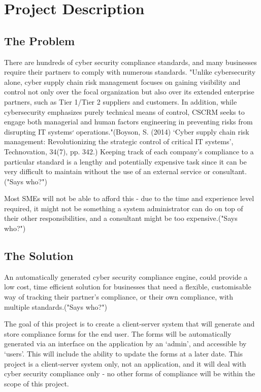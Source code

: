 \chapter{Project Description} \label{Chapter:one}
    \section{The Problem}
        There are hundreds of cyber security compliance standards, and many businesses require their partners to comply with numerous standards. "Unlike cybersecurity alone, cyber supply chain risk management focuses on gaining visibility and control not only over the focal organization but also over its extended enterprise partners, such as Tier 1/Tier 2 suppliers and customers. In addition, while cybersecurity emphasizes purely technical means of control, CSCRM seeks to engage both managerial and human factors engineering in preventing risks from disrupting IT systems׳ operations."(Boyson, S. (2014) ‘Cyber supply chain risk management: Revolutionizing the strategic control of critical IT systems’, Technovation, 34(7), pp. 342.) Keeping track of each company’s compliance to a particular standard is a lengthy and potentially expensive task since it can be very difficult to maintain without the use of an external service or consultant. ("Says who?")

        Most SMEs will not be able to afford this - due to the time and experience level required, it might not be something a system administrator can do on top of their other responsibilities, and a consultant might be too expensive.("Says who?")

    \section{The Solution}
        An automatically generated cyber security compliance engine, could provide a low cost, time efficient solution for businesses that need a flexible, customisable way of tracking their partner’s compliance, or their own compliance, with multiple standards.("Says who?")

        The goal of this project is to create a client-server system that will generate and store compliance forms for the end user. The forms will be automatically generated via an interface on the application by an ‘admin’, and accessible by ‘users’. This will include the ability to update the forms at a later date. This project is a client-server system only, not an application, and it will deal with cyber security compliance only - no other forms of compliance will be within the scope of this project.